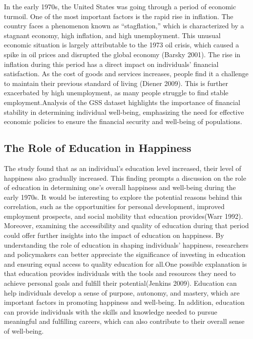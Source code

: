 \documentclass[
  letterpaper,
  DIV=11,
  numbers=noendperiod]{scrartcl}
\begin{document}
In the early 1970s, the United States was going through a period of
economic turmoil. One of the most important factors is the rapid rise in
inflation. The country faces a phenomenon known as ``stagflation,''
which is characterized by a stagnant economy, high inflation, and high
unemployment. This unusual economic situation is largely attributable to
the 1973 oil crisis, which caused a spike in oil prices and disrupted
the global economy (Barsky 2001). The rise in inflation during this
period has a direct impact on individuals' financial satisfaction. As
the cost of goods and services increases, people find it a challenge to
maintain their previous standard of living (Diener 2009). This is
further exacerbated by high unemployment, as many people struggle to
find stable employment.Analysis of the GSS dataset highlights the
importance of financial stability in determining individual well-being,
emphasizing the need for effective economic policies to ensure the
financial security and well-being of populations.

\hypertarget{the-role-of-education-in-happiness}{%
\subsection{The Role of Education in
Happiness}\label{the-role-of-education-in-happiness}}

The study found that as an individual's education level increased, their
level of happiness also gradually increased. This finding prompts a
discussion on the role of education in determining one's overall
happiness and well-being during the early 1970s. It would be interesting
to explore the potential reasons behind this correlation, such as the
opportunities for personal development, improved employment prospects,
and social mobility that education provides(Warr 1992). Moreover,
examining the accessibility and quality of education during that period
could offer further insights into the impact of education on happiness.
By understanding the role of education in shaping individuals'
happiness, researchers and policymakers can better appreciate the
significance of investing in education and ensuring equal access to
quality education for all.One possible explanation is that education
provides individuals with the tools and resources they need to achieve
personal goals and fulfill their potential(Jenkins 2009). Education can
help individuals develop a sense of purpose, autonomy, and mastery,
which are important factors in promoting happiness and well-being. In
addition, education can provide individuals with the skills and
knowledge needed to pursue meaningful and fulfilling careers, which can
also contribute to their overall sense of well-being.
\end{document}
